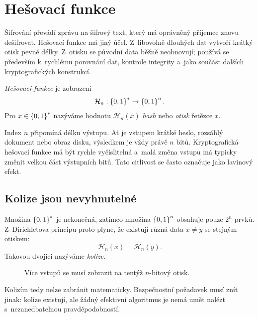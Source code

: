 \section{Hešovací funkce}\label{sec:krypto-hash}

Šifrování převádí zprávu na šifrový text, který má oprávněný příjemce znovu dešifrovat. Hešovací funkce má jiný účel. Z~libovolně dlouhých dat vytvoří krátký otisk pevné délky. Z~otisku se původní data běžně neobnovují; používá se především k~rychlému porovnání dat, kontrole integrity a~jako součást dalších kryptografických konstrukcí.

\begin{definition}\label{def:krypto-hash}
    \emph{Hešovací funkce} je zobrazení
    \[
        \mathcal{H}_n:\left\{0,1\right\}^{*} \rightarrow \left\{0,1\right\}^{n}.
    \]
    Pro $x\in\left\{0,1\right\}^{*}$ nazýváme hodnotu $\mathcal{H}_n(x)$ \emph{hash} nebo \emph{otisk} řetězce $x$.
\end{definition}

Index $n$ připomíná délku výstupu. Ať je vstupem krátké heslo, rozsáhlý dokument nebo obraz disku, výsledkem je vždy právě $n$ bitů. Kryptografická hešovací funkce má být rychle vyčíslitelná a~malá změna vstupu má typicky změnit velkou část výstupních bitů. Tato citlivost se často označuje jako lavinový efekt.


\subsection{Kolize jsou nevyhnutelné}

Množina $\left\{0,1\right\}^{*}$ je nekonečná, zatímco množina $\left\{0,1\right\}^{n}$ obsahuje pouze $2^n$ prvků. Z~Dirichletova principu proto plyne, že existují různá data $x\neq y$ se stejným otiskem:
\[
    \mathcal{H}_n(x)=\mathcal{H}_n(y).
\]
Takovou dvojici nazýváme \emph{kolize}.

\begin{figure}[ht]
    \centering
    
    \caption{Více vstupů se musí zobrazit na tentýž $n$-bitový otisk.}
    \label{fig:krypto-hash-kolize}
\end{figure}

Kolizím tedy nelze zabránit matematicky. Bezpečnostní požadavek musí znít jinak: kolize existují, ale žádný efektivní algoritmus je nemá umět nalézt s~nezanedbatelnou pravděpodobností.


